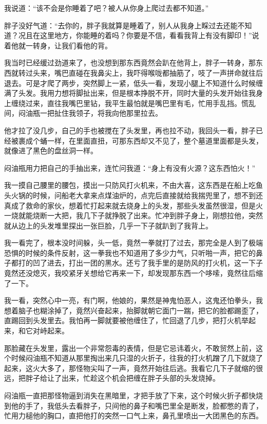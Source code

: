 我说道：“该不会是你睡着了吧？被人从你身上爬过去都不知道。”

胖子没好气道：“去你的，胖子我就算是睡着了，别人从我身上睬过去还能不知道？况且在这里地方，你能睡的着吗？你要是不信，看看我背上有没有脚印！”说着他就一转身，让我们看他的背。

我当时已经缓过劲道来了，也没想到那东西竟然会趴在他背上，胖子一转身，那东西就转过头来，嘴巴直碰在我鼻尖上，我吓得喉咙都抽筋了，吱了一声拼命就往后退去。可是才爬了两步，突然脚上一紧，低头一看，发现小腿上不知道什么时候缠满了头发。我用力想将脚扯出来，但是根本挣脱不开，同时大量的头发开始往我身上缠绕过来，直往我嘴巴里钻，我平生最怕就是嘴巴里有毛，忙用手乱挡。慌乱间，闷油瓶一把扯住我领子，将我向他那里拉去。

他才拉了没几步，自己的手也被搅在了头发里，再也拉不动，我回头一看，胖子已经被裹成个蛹一样，在里面直扭，可那东西却又不见了，整个墓道里面都是头发，就像进了黑色的盘丝洞一样。

闷油瓶用力把自己的手抽出来，连忙问我道：“身上有没有火源？这东西怕火！”

我一摸自己腰里的腰包，摸出一只防风打火机来，不由大喜，这东西是在船上吃鱼头火锅的时候，问船老大拿来点煤油炉的，点完后直接就给我揣兜里了，想不到还真成了救命的家伙，想着忙打起来就去烧身上的头发，那些头发虽然很湿，但是火一烧就能烧断一大把，我几下子就挣脱了出来。忙冲到胖子身上，刚想拉他，突然就从边上的头发堆里探出一张巨脸，几乎一下子就趴到了我背上。

我一看完了，根本没时间躲，头一低，竟然一拳就打了过去，那完全是人到了极端恐惧的时候的条件反射，这一拳我也不知道用了多少力气，只听啪一声，把它的鼻子都打的凹了进去，打出一团的黑水。还亏了我手里的是防风的打火机，这一下子竟然还没熄灭，我咬紧牙关想给它再来一下，却发现那东西一个哆嗦，竟然往后缩了一下。

我一看，突然心中一亮，有门啊，他娘的，果然是神鬼怕恶人，这鬼还怕拳头，我想着脑子也糊涂掉了，竟然兴奋起来，抬脚就朝它面门一踹，把它的脸都踢歪了，直踢回到头发里去。我怕再一脚就要被他缠住了，忙回退了几步，把打火机举起来，和它对峙起来。

那脸藏在头发里，露出一个非常怨毒的表情，但是它忌讳着火，不敢贸然上前，这个时候闷油瓶不知道从那里掏出来几只湿的火折子，往我的打火机蹭了几下就烧了起来，这火大多了，那怪物尖叫了一声，竟然开始往后逃。我看它几下子就缩的很远，把胖子给让了出来，忙趁这个机会把缠在胖子头部的头发烧掉。

闷油瓶一直把那怪物逼到消失在黑暗里，才把手放了下来，这个时候火折子都快烧到他的手了，我低头去看胖子，只间他的鼻子和嘴巴里全是断发，脸都憋的青了，忙用力槌他的胸口，直把他打的突然一口气上来，鼻孔里喷出一大团黑色的东西。

